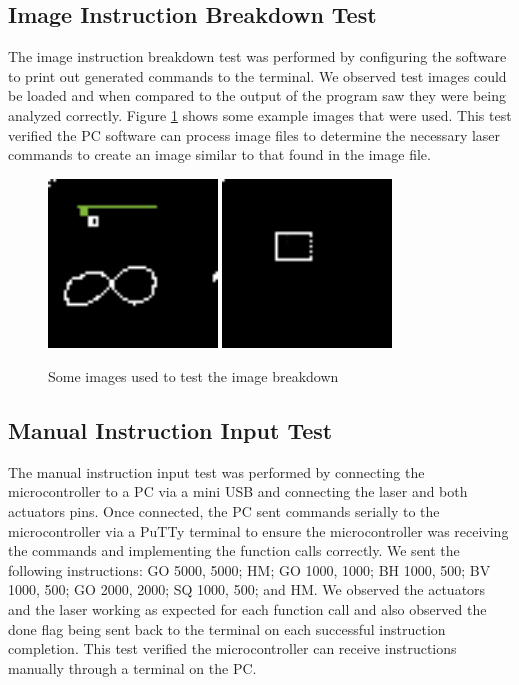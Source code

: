 \documentclass[11pt]{LaTeX-Classes/math-hw}
\begin{document}
\subsection{Image Instruction Breakdown Test}
The image instruction breakdown test was performed by configuring the software to print out
generated commands to the terminal. We observed test images could be loaded and when compared to the output of the program saw they were being
analyzed correctly. Figure \ref{fig:test-images} shows some example images that were used. This test verified the PC software can process image files to determine the necessary laser commands to create an image similar to that found in the image file.
\begin{figure}[H]
  \begin{center}
    \includegraphics[width=0.4\textwidth]{test3}
    \includegraphics[width=0.4\textwidth]{test4}
    \caption{Some images used to test the image breakdown}
    \label{fig:test-images}
  \end{center}
\end{figure}

\subsection{Manual Instruction Input Test}
The manual instruction input test was performed by connecting the microcontroller to a PC via a mini USB and connecting the laser and both actuators pins. Once connected, the PC sent commands serially to the microcontroller via a PuTTy terminal to ensure the microcontroller was receiving the commands and implementing the function calls correctly. We sent the following instructions: GO 5000, 5000; HM; GO 1000, 1000; BH 1000, 500; BV 1000, 500; GO 2000, 2000; SQ 1000, 500; and HM. We observed the actuators and the laser working as expected for each function call and also observed the done flag being sent back to the terminal on each successful instruction completion. This test verified the microcontroller can receive instructions manually through a terminal on the PC.
\end{document}
